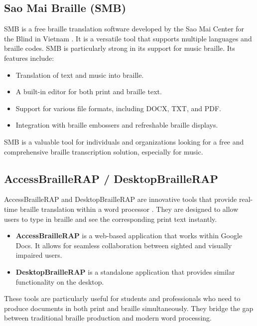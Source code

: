 \subsection{Sao Mai Braille (SMB)}\label{ch12:ssec:smb}
SMB is a free braille translation software developed by the Sao Mai Center for the Blind in Vietnam \supercite{SaoMaiBraille}. It is a versatile tool that supports multiple languages and braille codes. SMB is particularly strong in its support for music braille. Its features include:
\begin{itemize}
	\item Translation of text and music into braille.
	\item A built-in editor for both print and \gls{braille} text.
	\item Support for various file formats, including DOCX, TXT, and PDF.
	\item Integration with braille embossers and refreshable braille displays.
\end{itemize}
SMB is a valuable tool for individuals and organizations looking for a free and comprehensive braille transcription solution, especially for \gls{music}.

\subsection{AccessBrailleRAP / DesktopBrailleRAP}\label{ch12:ssec:braillerap}
AccessBrailleRAP and DesktopBrailleRAP are innovative tools that provide real-time braille translation within a word processor \supercite{AccessBrailleRAP}. They are designed to allow users to type in braille and see the corresponding print text instantly.
\begin{itemize}
	\item \textbf{AccessBrailleRAP} is a web-based application that works within Google Docs. It allows for seamless collaboration between sighted and visually impaired users.
	\item \textbf{DesktopBrailleRAP} is a standalone application that provides similar functionality on the desktop.
\end{itemize}
These tools are particularly useful for students and professionals who need to produce documents in both print and braille simultaneously. They bridge the gap between traditional braille production and modern word processing.

